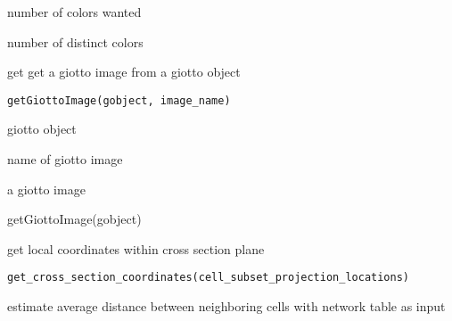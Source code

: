 \documentclass[a4paper]{book}
\begin{document}
%
\begin{Arguments}
\begin{ldescription}
\item[\code{n}] number of colors wanted
\end{ldescription}
\end{Arguments}
%
\begin{Value}
number of distinct colors
\end{Value}
%
\begin{Description}\relax
get get a giotto image from a giotto object
\end{Description}
%
\begin{Usage}
\begin{verbatim}
getGiottoImage(gobject, image_name)
\end{verbatim}
\end{Usage}
%
\begin{Arguments}
\begin{ldescription}
\item[\code{gobject}] giotto object

\item[\code{image\_name}] name of giotto image 
\end{ldescription}
\end{Arguments}
%
\begin{Value}
a giotto image
\end{Value}
%
\begin{Examples}
\begin{ExampleCode}
    getGiottoImage(gobject)
\end{ExampleCode}
\end{Examples}
%
\begin{Description}\relax
get local coordinates within cross section plane
\end{Description}
%
\begin{Usage}
\begin{verbatim}
get_cross_section_coordinates(cell_subset_projection_locations)
\end{verbatim}
\end{Usage}
%
\begin{Description}\relax
estimate average distance between neighboring cells with network table as input
\end{Description}
\end{document}
